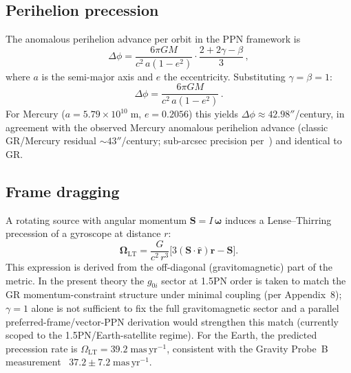 \documentclass[aps,prd,onecolumn,superscriptaddress,nofootinbib,showpacs,12pt]{revtex4-2}
\begin{document}
\subsection{Perihelion precession}\label{sec:perihelion}

The anomalous perihelion advance per orbit in the PPN
framework is~\cite{Will2014}
\begin{equation}\label{eq:precession_ppn}
  \Delta\phi = \frac{6\pi GM}{c^{2}\,a(1-e^{2})}
    \cdot\frac{2 + 2\gamma - \beta}{3}\,,
\end{equation}
where $a$ is the semi-major axis and $e$ the eccentricity.
Substituting $\gamma = \beta = 1$:
\begin{equation}\label{eq:precession}
  \Delta\phi = \frac{6\pi GM}{c^{2}\,a(1-e^{2})}\,.
\end{equation}
For Mercury ($a = 5.79 \times 10^{10}\;\mathrm{m}$,
$e = 0.2056$) this yields
$\Delta\phi \approx 42.98''$/century, in agreement with
the observed Mercury anomalous perihelion advance
(classic GR/Mercury residual ${\sim}43''$/century;
sub-arcsec precision per~\cite{Will2014}) and
identical to GR.

\subsection{Frame dragging}\label{sec:framedragging}

A rotating source with angular momentum
$\mathbf{S} = I\,\bm{\omega}$ induces a Lense--Thirring
precession of a gyroscope at distance $r$:
\begin{equation}\label{eq:LT}
  \bm{\Omega}_{\mathrm{LT}} = \frac{G}{c^{2}\,r^{3}}
    \bigl[3(\mathbf{S}\cdot\hat{\mathbf{r}})\hat{\mathbf{r}}
    - \mathbf{S}\bigr].
\end{equation}
This expression is derived from the off-diagonal
(gravitomagnetic) part of the metric.  In the present
theory the $g_{0i}$ sector at 1.5PN order is taken to
match the GR momentum-constraint structure under minimal
coupling (per Appendix~8); $\gamma = 1$ alone is not
sufficient to fix the full gravitomagnetic sector and a
parallel preferred-frame/vector-PPN derivation would
strengthen this match (currently scoped to the
1.5PN/Earth-satellite regime).  For the Earth, the predicted
precession rate is
$\Omega_{\mathrm{LT}} = 39.2\;\mathrm{mas\,yr^{-1}}$,
consistent with the Gravity Probe~B
measurement~\cite{Everitt2011}
$37.2 \pm 7.2\;\mathrm{mas\,yr^{-1}}$.
\end{document}
